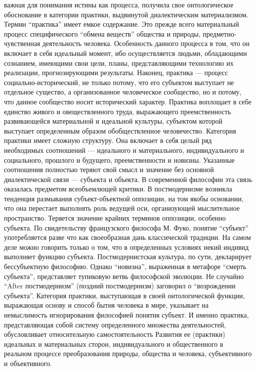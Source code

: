 \documentclass[12pt]{article}
\begin{document}
важная для понимания истины как процесса, получила свое онтологическое обоснование в категории практики,
выдвинутой диалектическим материализмом. Термин “практика” имеет емкое содержание. Это прежде всего
материальный  процесс  специфического  “обмена  веществ”  общества  и  природы,  предметно-чувственная
деятельность человека. Особенность данного процесса в том, что он включает в себя идеальный момент, ибо
осуществляется  людьми,  обладающими  сознанием,  имеющими  свои  цели,  планы,  представляющими
технологию  их  реализации,  прогнозирующими  результаты.  Наконец,  практика  —  процесс  социально-исторический,  не  только  потому,  что  его  субъектом  выступает  не  отдельное  существо,  а  организованное
человеческое  сообщество,  но  и  потому,  что  данное  сообщество  носит  исторический  характер.  Практика
воплощает в себе единство живого и овеществленного труда, выражающего преемственность развивающейся
материальной и идеальной культуры, субъектом которой выступает определенным образом обобществленное
человечество.
Категория практики имеет сложную структуру. Она включает в себя целый ряд необходимых соотношений —
идеального  и  материального,  индивидуального  и  социального,  прошлого  и  будущего,  преемственности  и
новизны. Указанные соотношения полностью теряют свой смысл и значение без основной диалектической
связи — субъекта и объекта.
В  современной  философии  эта  связь  оказалась  предметом  всеобъемлющей  критики.  В  постмодернизме
возникла тенденция размывания субъект-объектной оппозиции, на том якобы основании, что она перестает
выполнять роль ведущей оси, организующей мыслительное пространство. Теряется значение крайних терминов
оппозиции,  особенно  субъекта.  По  свидетельству  французского  философа  М.  Фуко,  понятие  “субъект”
употребляется разве что как своеобразная дань классической традиции. На самом деле можно говорить только о
том, что в определенных условиях некий индивид выполняет функцию субъекта. Постмодернистская культура,
по сути, декларирует бессубъектную философию. Однако “новизна”, выраженная в метафоре “смерть субъекта”,
представляет  тупиковую  ветвь  философской  эволюции.  Не  случайно  “After  постмодернизм”  (поздний
постмодернизм) заговорил о “возрождении субъекта”.
Категория практики, выступающая в своей онтологической функции, выражающая основу и способ бытия
человека в мире, указывает на немыслимость игнорирования философией понятия субъект. И именно практика,
представляющая  собой  систему  определенного  множества  деятельностей,  обусловливает  относительную
самостоятельность  Развития  ее  (практики)  идеальных  и  материальных  сторон,  индивидуального  и
общественного  в  реальном  процессе  преобразования  природы,  общества  и  человека,  субъективного  и
объективного.
\end{document}
